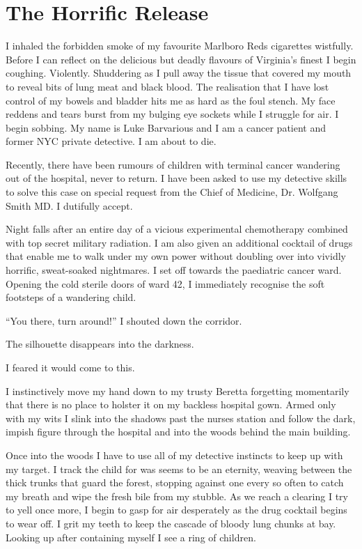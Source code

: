 \chapter{The Horrific Release}





I inhaled the forbidden smoke of my favourite Marlboro Reds
cigarettes wistfully. Before I can reflect on the delicious but
deadly flavours of Virginia's finest I begin coughing. Violently.
Shuddering as I pull away the tissue that covered my mouth to
reveal bits of lung meat and black blood. The realisation that I
have lost control of my bowels and bladder hits me as hard as the
foul stench. My face reddens and tears burst from my bulging eye
sockets while I struggle for air. I begin sobbing. My name is Luke
Barvarious and I am a cancer patient and former NYC private
detective. I am about to die.

Recently, there have been rumours of children with terminal cancer
wandering out of the hospital, never to return. I have been asked
to use my detective skills to solve this case on special request
from the Chief of Medicine, Dr. Wolfgang Smith MD. I dutifully
accept.

Night falls after an entire day of a vicious experimental
chemotherapy combined with top secret military radiation. I am also
given an additional cocktail of drugs that enable me to walk under
my own power without doubling over into vividly horrific,
sweat-soaked nightmares. I set off towards the paediatric cancer
ward. Opening the cold sterile doors of ward 42, I immediately
recognise the soft footsteps of a wandering child.

``You there, turn around!'' I shouted down the corridor.

The silhouette disappears into the darkness.

I feared it would come to this.

I instinctively move my hand down to my trusty Beretta forgetting
momentarily that there is no place to holster it on my backless
hospital gown. Armed only with my wits I slink into the shadows
past the nurses station and follow the dark, impish figure through
the hospital and into the woods behind the main building.

Once into the woods I have to use all of my detective instincts to
keep up with my target. I track the child for was seems to be an
eternity, weaving between the thick trunks that guard the forest,
stopping against one every so often to catch my breath and wipe the
fresh bile from my stubble. As we reach a clearing I try to yell
once more, I begin to gasp for air desperately as the drug cocktail
begins to wear off. I grit my teeth to keep the cascade of bloody
lung chunks at bay. Looking up after containing myself I see a ring
of children.

